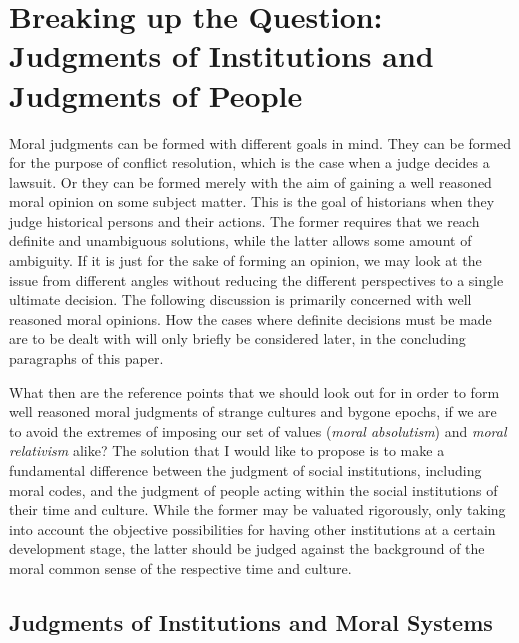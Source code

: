 \documentclass[12pt,a4paper,ngerman]{article}
\begin{document}
\section{Breaking up the Question: Judgments
of Institutions and Judgments of People}

Moral judgments can be formed with different goals in mind. They can be formed
for the purpose of conflict resolution, which is the case when a judge decides
a lawsuit. Or they can be formed merely with the aim of gaining a well reasoned
moral opinion on some subject matter. This is the goal of historians when they
judge historical persons and their actions. The former requires that we
reach definite and unambiguous solutions, while the latter allows some amount
of ambiguity. If it is just for the sake of forming an opinion, we may look at
the issue from different angles without reducing the different perspectives to
a single ultimate decision. The following discussion is primarily concerned
with well reasoned moral opinions. How the cases where definite decisions must
be made are to be dealt with will only briefly be considered later, in the
concluding paragraphs of this paper.

What then are the reference points that we should look out for in
order to form well reasoned moral judgments of strange cultures and
bygone epochs, if we are to avoid the extremes of imposing our set of
values ({\em moral absolutism}) and {\em moral relativism} alike? The
solution that I would like to propose is to make a fundamental
difference between the judgment of social institutions, including
moral codes, and the judgment of people acting within the social
institutions of their time and culture. While the former may be
valuated rigorously, only taking into account the objective
possibilities for having other institutions at a certain development
stage, the latter should be judged against the background of the moral
common sense of the respective time and culture.

\subsection{Judgments of Institutions and Moral Systems}
\end{document}
